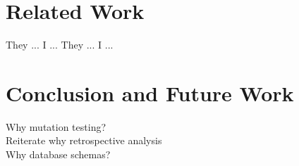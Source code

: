\documentclass[conference]{IEEEtran}
\begin{document}
%
%
%
%

\section{Related Work}
They ...
I ...
They ...
I ...

\section{Conclusion and Future Work}
Why mutation testing? \\
Reiterate why retrospective analysis \\
Why database schemas? \\
\end{document}
